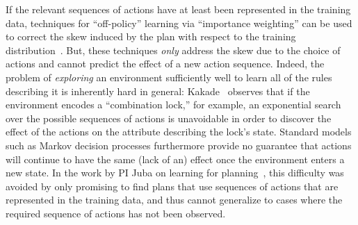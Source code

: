 \documentclass[12pt]{article}
\newcommand{\note}[1]{\textbf{\textit{#1}}}
\begin{document}
If the relevant sequences of actions have at least been represented in the training data, techniques for ``off-policy'' learning via ``importance weighting'' can be used to correct the skew induced by the plan with respect to the training distribution~\cite{precup2000off-policy,precup2001off-policy,shelton2001,peshkin2001,peshkin2002,uchibe2004,wawrzynski2009,hachiya2009,hachiya2011,juba2016jmlr}. But, these techniques {\em only} address the skew due to the choice of actions and cannot predict the effect of a new action sequence. Indeed, the problem of {\em exploring} an environment sufficiently well to learn all of the rules describing it is inherently hard in general: Kakade~\cite[Section~8.6]{kakade2003thesis} observes that if the environment encodes a ``combination lock,'' for example, an exponential search over the possible sequences of actions is unavoidable in order to discover the effect of the actions on the attribute describing the lock's state. Standard models such as Markov decision processes furthermore provide no guarantee that actions will continue to have the same (lack of an) effect once the environment enters a new state. 
In the work by PI Juba on learning for planning~\cite{juba2016jmlr}, this difficulty was avoided by only promising to find plans that use sequences of actions that are represented in the training data, and thus cannot generalize to cases where the required sequence of actions has not been observed. %

\end{document}
